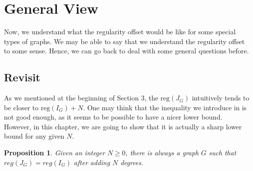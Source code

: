 \documentclass[dvipsnames,10pt]{article}
\newtheorem{proposition}[theorem]{Proposition}
\begin{document}
\section{General View}
Now, we understand what the regularity offset would be like for some special types of graphs. We may be able to say that we understand the regularity offset to some sense. Hence, we can go back to deal with some general questions before.

\subsection{Revisit }
As we mentioned at the beginning of Section 3, the $\mathrm{reg} (J_G)$ intuitively tends to be closer to $\mathrm{reg} (I_G)+N$. One may think that the inequality we introduce in  is not good enough, as it seems to be possible to have a nicer lower bound. However, in this chapter, we are going to show that it is actually a sharp lower bound for any given $N$.
\begin{proposition}
    Given an integer $N\geq0$, there is always a graph $G$ such that $reg(J_G)=reg(I_G)$ after adding $N$ degrees.
\end{proposition}
\end{document}
